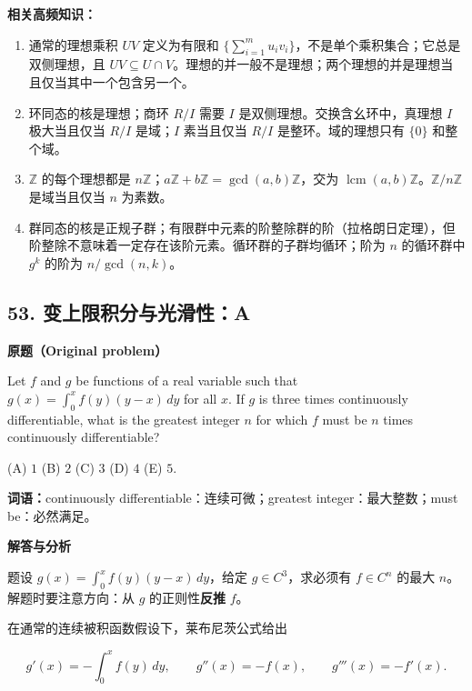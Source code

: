 \documentclass[11pt,a4paper]{ctexart}
\providecommand{\tightlist}{\setlength{\itemsep}{0pt}\setlength{\parskip}{0pt}}
\begin{document}
\textbf{相关高频知识：}

\begin{enumerate}
\def\labelenumi{\arabic{enumi}.}
\tightlist
\item
  通常的理想乘积 \(UV\) 定义为有限和
  \(\{\sum_{i=1}^m u_iv_i\}\)，不是单个乘积集合；它总是双侧理想，且
  \(UV\subseteq U\cap V\)。理想的并一般不是理想；两个理想的并是理想当且仅当其中一个包含另一个。
\item
  环同态的核是理想；商环 \(R/I\) 需要 \(I\)
  是双侧理想。交换含幺环中，真理想 \(I\) 极大当且仅当 \(R/I\)
  是域；\(I\) 素当且仅当 \(R/I\) 是整环。域的理想只有 \(\{0\}\)
  和整个域。
\item
  \(\mathbb Z\) 的每个理想都是
  \(n\mathbb Z\)；\(a\mathbb Z+b\mathbb Z=\gcd(a,b)\mathbb Z\)，交为
  \(\operatorname{lcm}(a,b)\mathbb Z\)。\(\mathbb Z/n\mathbb Z\)
  是域当且仅当 \(n\) 为素数。
\item
  群同态的核是正规子群；有限群中元素的阶整除群的阶（拉格朗日定理），但阶整除不意味着一定存在该阶元素。循环群的子群均循环；阶为
  \(n\) 的循环群中 \(g^k\) 的阶为 \(n/\gcd(n,k)\)。
\end{enumerate}

\hypertarget{ux53d8ux4e0aux9650ux79efux5206ux4e0eux5149ux6ed1ux6027a}{%
\subsection{53.
变上限积分与光滑性：A}\label{ux53d8ux4e0aux9650ux79efux5206ux4e0eux5149ux6ed1ux6027a}}

\textbf{原题（Original problem）}\par
Let $f$ and $g$ be functions of a real variable such that $g(x)=\int_0^x f(y)(y-x)\,dy$ for all $x$. If $g$ is three times continuously differentiable, what is the greatest integer $n$ for which $f$ must be $n$ times continuously differentiable?

(A) $1$ \quad (B) $2$ \quad (C) $3$ \quad (D) $4$ \quad (E) $5$.

\textbf{词语：}continuously differentiable：连续可微；greatest integer：最大整数；must be：必然满足。

\textbf{解答与分析}\par


题设 \(g(x)=\int_0^x f(y)(y-x)\,dy\)，给定 \(g\in C^3\)，求必须有
\(f\in C^n\) 的最大 \(n\)。解题时要注意方向：从 \(g\)
的正则性\textbf{反推} \(f\)。

在通常的连续被积函数假设下，莱布尼茨公式给出

\[g'(x)=-\int_0^x f(y)\,dy,\qquad g''(x)=-f(x),\qquad g'''(x)=-f'(x).\]
\end{document}
